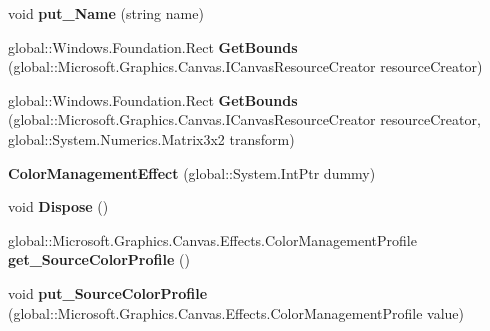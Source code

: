 \begin{DoxyCompactItemize}
void {\bfseries put\+\_\+\+Name} (string name)
\item 
\mbox{\label{class_microsoft_1_1_graphics_1_1_canvas_1_1_effects_1_1_color_management_effect_a1f3e48ab364e54824fccfd8a758ff7cc}} 
global\+::\+Windows.\+Foundation.\+Rect {\bfseries Get\+Bounds} (global\+::\+Microsoft.\+Graphics.\+Canvas.\+I\+Canvas\+Resource\+Creator resource\+Creator)
\item 
\mbox{\label{class_microsoft_1_1_graphics_1_1_canvas_1_1_effects_1_1_color_management_effect_acb5d9d935fe858ae3b57861c92b3d846}} 
global\+::\+Windows.\+Foundation.\+Rect {\bfseries Get\+Bounds} (global\+::\+Microsoft.\+Graphics.\+Canvas.\+I\+Canvas\+Resource\+Creator resource\+Creator, global\+::\+System.\+Numerics.\+Matrix3x2 transform)
\item 
\mbox{\label{class_microsoft_1_1_graphics_1_1_canvas_1_1_effects_1_1_color_management_effect_aa98fb6a9945a4d5480799dcff373d48b}} 
{\bfseries Color\+Management\+Effect} (global\+::\+System.\+Int\+Ptr dummy)
\item 
\mbox{\label{class_microsoft_1_1_graphics_1_1_canvas_1_1_effects_1_1_color_management_effect_a9fe37cfd32383d04402b1d66ee3eda0a}} 
void {\bfseries Dispose} ()
\item 
\mbox{\label{class_microsoft_1_1_graphics_1_1_canvas_1_1_effects_1_1_color_management_effect_a6b058fa689ed71507e964b28fe6170c5}} 
global\+::\+Microsoft.\+Graphics.\+Canvas.\+Effects.\+Color\+Management\+Profile {\bfseries get\+\_\+\+Source\+Color\+Profile} ()
\item 
\mbox{\label{class_microsoft_1_1_graphics_1_1_canvas_1_1_effects_1_1_color_management_effect_a5810de208f1afdb9ab4f2e1b99d5216f}} 
void {\bfseries put\+\_\+\+Source\+Color\+Profile} (global\+::\+Microsoft.\+Graphics.\+Canvas.\+Effects.\+Color\+Management\+Profile value)

\end{DoxyCompactItemize}

